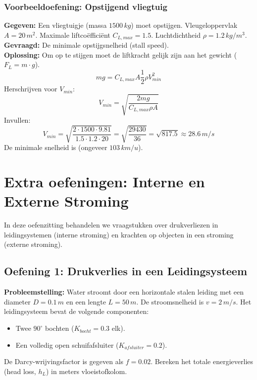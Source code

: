 \documentclass[a4paper,11pt,twoside]{report}
\begin{document}
\subsubsection*{Voorbeeldoefening: Opstijgend vliegtuig}
\textbf{Gegeven:} Een vliegtuigje (massa $1500 \, kg$) moet opstijgen. Vleugeloppervlak $A = 20 \, m^2$. Maximale liftcoëfficiënt $C_{L,max} = 1.5$. Luchtdichtheid $\rho = 1.2 \, kg/m^3$.\\
\textbf{Gevraagd:} De minimale opstijgsnelheid (stall speed).\\
\textbf{Oplossing:}
Om op te stijgen moet de liftkracht gelijk zijn aan het gewicht ($F_L = m \cdot g$).
\[ m g = C_{L,max} A \frac{1}{2} \rho V_{min}^2 \]
Herschrijven voor $V_{min}$:
\[ V_{min} = \sqrt{\frac{2 m g}{C_{L,max} \rho A}} \]
Invullen:
\[ V_{min} = \sqrt{\frac{2 \cdot 1500 \cdot 9.81}{1.5 \cdot 1.2 \cdot 20}} = \sqrt{\frac{29430}{36}} = \sqrt{817.5} \approx 28.6 \, m/s \]
De minimale snelheid is  (ongeveer $103 \, km/u$).

\section{Extra oefeningen: Interne en Externe Stroming}
In deze oefenzitting behandelen we vraagstukken over drukverliezen in leidingsystemen (interne stroming) en krachten op objecten in een stroming (externe stroming).

\subsection{Oefening 1: Drukverlies in een Leidingsysteem}
\textbf{Probleemstelling:}
Water stroomt door een horizontale stalen leiding met een diameter $D = 0.1 \, m$ en een lengte $L = 50 \, m$. De stroomsnelheid is $v = 2 \, m/s$. Het leidingsysteem bevat de volgende componenten:
\begin{itemize}
    \item Twee $90^\circ$ bochten ($K_{bocht} = 0.3$ elk).
    \item Een volledig open schuifafsluiter ($K_{afsluiter} = 0.2$).
\end{itemize}
De Darcy-wrijvingsfactor is gegeven als $f = 0.02$.
Bereken het totale energieverlies (head loss, $h_L$) in meters vloeistofkolom.
\end{document}
